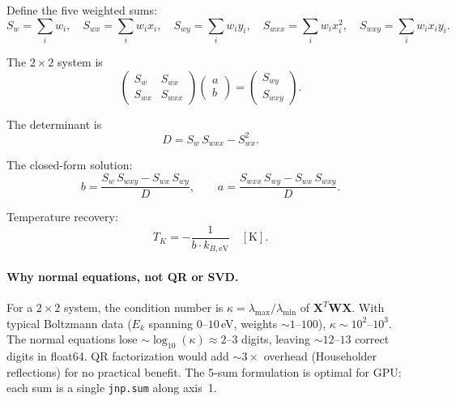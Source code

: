 \documentclass[11pt]{article}
\newcommand{\kbeV}{k_{B,\text{eV}}}
\begin{document}
Define the five weighted sums:
\begin{equation}
  S_w = \sum_i w_i, \quad
  S_{wx} = \sum_i w_i x_i, \quad
  S_{wy} = \sum_i w_i y_i, \quad
  S_{wxx} = \sum_i w_i x_i^2, \quad
  S_{wxy} = \sum_i w_i x_i y_i.
  \label{eq:sums}
\end{equation}

The $2 \times 2$ system is
\begin{equation}
  \begin{pmatrix} S_w & S_{wx} \\ S_{wx} & S_{wxx} \end{pmatrix}
  \begin{pmatrix} a \\ b \end{pmatrix}
  = \begin{pmatrix} S_{wy} \\ S_{wxy} \end{pmatrix}.
  \label{eq:2x2_system}
\end{equation}

The determinant is
\begin{equation}
  D = S_w\,S_{wxx} - S_{wx}^2.
  \label{eq:det}
\end{equation}

The closed-form solution:
\begin{equation}
  \boxed{b = \frac{S_w\,S_{wxy} - S_{wx}\,S_{wy}}{D}, \qquad
         a = \frac{S_{wxx}\,S_{wy} - S_{wx}\,S_{wxy}}{D}.}
  \label{eq:slope_intercept}
\end{equation}

Temperature recovery:
\begin{equation}
  \boxed{T_K = -\frac{1}{b \cdot \kbeV} \quad [\text{K}].}
  \label{eq:temperature}
\end{equation}

\paragraph{Why normal equations, not QR or SVD.}
For a $2 \times 2$ system, the condition number is
$\kappa = \lambda_{\max}/\lambda_{\min}$ of $\mathbf{X}^T\mathbf{W}\mathbf{X}$.
With typical Boltzmann data ($E_k$ spanning $0$--$10$\,eV, weights $\sim 1$--$100$),
$\kappa \sim 10^2$--$10^3$. The normal equations lose $\sim \log_{10}(\kappa) \approx 2$--$3$
digits, leaving $\sim 12$--$13$ correct digits in float64. QR factorization would
add $\sim 3\times$ overhead (Householder reflections) for no practical benefit.
The 5-sum formulation is optimal for GPU: each sum is a single \texttt{jnp.sum}
along axis~1.
\end{document}
